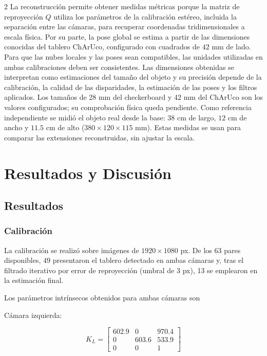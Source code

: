 \documentclass[10pt,a4paper]{article}
\begin{document}
\begin{multicols}{2}
La reconstrucción permite obtener medidas métricas porque la matriz de reproyección $Q$ utiliza los parámetros de la 
calibración estéreo, incluida la separación entre las cámaras, para recuperar coordenadas tridimensionales a escala física. 
Por su parte, la pose global se estima a partir de las dimensiones conocidas del tablero ChArUco, configurado con cuadrados de 
$42$ mm de lado. Para que las nubes locales y las poses sean compatibles, las unidades utilizadas en ambas calibraciones deben 
ser consistentes. Las dimensiones obtenidas se interpretan como estimaciones del tamaño del objeto y su precisión depende de la 
calibración, la calidad de las disparidades, la estimación de las poses y los filtros aplicados.
Los tamaños de 28 mm del checkerboard y 42 mm del ChArUco son los valores configurados;
su comprobación física queda pendiente. Como referencia independiente se midió el objeto real
desde la base: $38$ cm de largo, $12$ cm de ancho y $11.5$ cm de alto
($380\times120\times115$ mm). Estas medidas se usan para comparar las extensiones
reconstruidas, sin ajustar la escala.

\section{Resultados y Discusión}

\subsection{Resultados}

\subsubsection{Calibración}
La calibración se realizó sobre imágenes de $1920\times1080$ px. De los 63 pares disponibles,
49 presentaron el tablero detectado en ambas cámaras y, tras el filtrado iterativo por error de
reproyección (umbral de 3 px), 13 se emplearon en la estimación final.

Los parámetros intrínsecos obtenidos para ambas cámaras son

Cámara izquierda:

$$K_L = \begin{bmatrix} 602.9 & 0 & 970.4 \\ 0 & 603.6 & 533.9 \\ 0 & 0 & 1 \end{bmatrix}$$


\end{multicols}
\end{document}

